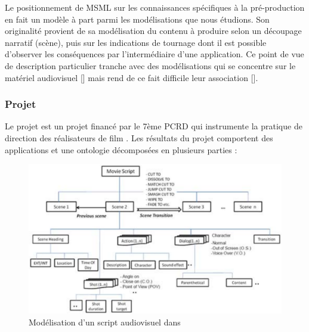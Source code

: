 Le positionnement de MSML sur les connaissances spécifiques à la pré-production en fait un modèle à part parmi les modélisations que nous étudions.
Son originalité provient de sa modélisation du contenu à produire selon un découpage narratif (scène), puis sur les indications de tournage dont il est possible d'observer les conséquences par l'intermédiaire d'une application.
Ce point de vue de description particulier tranche avec des modélisations qui se concentre sur le matériel audiovisuel [] mais rend de ce fait difficile leur association [].





\subsubsection{Projet }\label{sec:answer}
Le projet  est un projet financé par le 7ème PCRD qui instrumente la pratique de direction des réalisateurs de film . 
Les résultats du projet comportent des applications et une ontologie décomposées en plusieurs parties : 

\begin{figure}[ht!]
\centering
\includegraphics[width=\textwidth]{images/Ontofilm-concepts.png}
\caption{Modélisation d'un script audiovisuel dans }
\label{img:ontofilm}
\end{figure}


